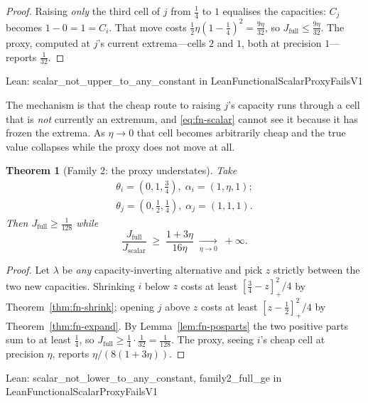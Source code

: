 \documentclass[conference]{IEEEtran}
\newtheorem{theorem}{Theorem}
\theoremstyle{definition}
\newcommand{\lean}[1]{\textsf{\footnotesize #1}}
\newcommand{\leanbox}[1]{%
  \par\vspace{2pt}\noindent
  {\footnotesize\textsf{Lean: #1}}\par\vspace{2pt}}
\begin{document}
\begin{proof}
Raising \emph{only} the third cell of $j$ from $\tfrac14$ to $1$ equalises the capacities:
$C_{j}$ becomes $1-0=1=C_{i}$. That move costs
$\tfrac12\eta(1-\tfrac14)^{2}=\tfrac{9\eta}{32}$, so
$J_{\mathrm{full}}\le\tfrac{9\eta}{32}$. The proxy, computed at $j$'s current extrema---cells
$2$ and $1$, both at precision $1$---reports $\tfrac{1}{32}$.
\end{proof}

\leanbox{\lean{scalar\_not\_upper\_to\_any\_constant} in
\lean{LeanFunctionalScalarProxyFailsV1}}

The mechanism is that the cheap route to raising $j$'s capacity runs through a cell that is
\emph{not} currently an extremum, and \eqref{eq:fn-scalar} cannot see it because it has frozen
the extrema. As $\eta\to0$ that cell becomes arbitrarily cheap and the true value collapses
while the proxy does not move at all.

\begin{theorem}[Family 2: the proxy understates]
\label{thm:fn-family2}
Take
\begin{align}
\theta_{i}=(0,1,\tfrac34),\;\alpha_{i}=(1,\eta,1);\\
\theta_{j}=(0,\tfrac12,\tfrac14),\;\alpha_{j}=(1,1,1).
\end{align}
Then $J_{\mathrm{full}}\ge\tfrac{1}{128}$ while
\begin{equation}
\frac{J_{\mathrm{full}}}{J_{\mathrm{scalar}}}
\;\geq\;\frac{1+3\eta}{16\eta}
\;\xrightarrow[\eta\to0]{}\;+\infty .
\label{eq:fn-family2}
\end{equation}
\end{theorem}

\begin{proof}
Let $\lambda$ be \emph{any} capacity-inverting alternative and pick $z$ strictly between the
two new capacities. Shrinking $i$ below $z$ costs at least $[\tfrac34-z]_{+}^{2}/4$ by
Theorem~\ref{thm:fn-shrink}; opening $j$ above $z$ costs at least $[z-\tfrac12]_{+}^{2}/4$ by
Theorem~\ref{thm:fn-expand}. By Lemma~\ref{lem:fn-posparts} the two positive parts sum to at least
$\tfrac14$, so $J_{\mathrm{full}}\ge\tfrac14\cdot\tfrac{1}{32}=\tfrac{1}{128}$. The proxy,
seeing $i$'s cheap cell at precision $\eta$, reports $\eta/(8(1+3\eta))$.
\end{proof}

\leanbox{\lean{scalar\_not\_lower\_to\_any\_constant}, \lean{family2\_full\_ge} in
\lean{LeanFunctionalScalarProxyFailsV1}}
\end{document}
